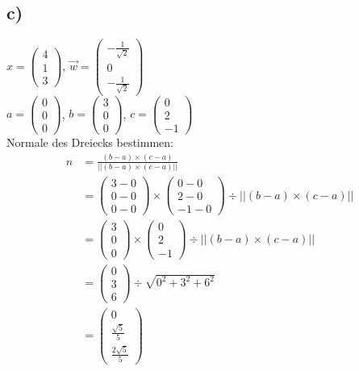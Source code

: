 \documentclass{article}
\begin{document}
\subsection*{c)}
$x = \begin{pmatrix}4 \\ 1 \\ 3 \end{pmatrix}$, $\vec{w} = \begin{pmatrix} -\frac{1}{\sqrt{2}} \\ 0 \\ -\frac{1}{\sqrt{2}} \end{pmatrix}$ \\
$a = \begin{pmatrix} 0 \\ 0 \\ 0 \end{pmatrix}$, $b = \begin{pmatrix} 3 \\ 0 \\ 0 \end{pmatrix}$, $c = \begin{pmatrix} 0 \\ 2 \\ -1 \end{pmatrix}$ \\
Normale des Dreiecks bestimmen:
\begin{align*}
    n & = \frac{(b-a) \times (c-a)}{||(b-a) \times (c-a)||}                                                                                                 \\
      & = \begin{pmatrix} 3 - 0 \\ 0 - 0 \\ 0 - 0 \end{pmatrix} \times \begin{pmatrix} 0 - 0 \\ 2 - 0 \\ -1 - 0 \end{pmatrix} \div ||(b-a) \times (c-a)|| \\
      & = \begin{pmatrix} 3 \\ 0 \\ 0 \end{pmatrix} \times \begin{pmatrix} 0 \\ 2 \\ -1 \end{pmatrix} \div ||(b-a) \times (c-a)||                     \\
      & = \begin{pmatrix} 0 \\ 3 \\ 6 \end{pmatrix} \div \sqrt{0^2 + 3^2 + 6^2} \\
      & = \begin{pmatrix} 0 \\  \frac{\sqrt{5}}{5} \\ \frac{2\sqrt{5}}{5} \end{pmatrix}
\end{align*}
\end{document}
